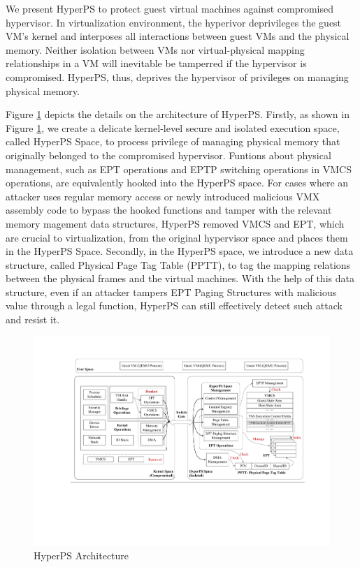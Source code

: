 We present HyperPS to protect guest virtual machines against compromised hypervisor. In virtualization environment, the hyperivor deprivileges the guest VM’s kernel and interposes all interactions between guest VMs and the physical memory. Neither isolation between VMs nor virtual-physical mapping relationships in a VM will inevitable be tamperred if the hypervisor is compromised. HyperPS, thus, deprives the hypervisor of privileges on managing physical memory.


Figure \ref{fig:design} depicts the details on the architecture of HyperPS. 
Firstly, as shown in Figure \ref{fig:design}, we create a delicate kernel-level secure and isolated execution space, called HyperPS Space, to process privilege of managing physical memory that originally belonged to the compromised hypervisor. 
Funtions about physical management, such as EPT operations and EPTP switching operations in VMCS operations, are equivalently hooked into the HyperPS space. 
For cases where an attacker uses regular memory access or newly introduced malicious VMX assembly code to bypass the hooked functions and tamper with the relevant memory magement data structures, HyperPS removed VMCS and EPT, which are crucial to virtualization, from the original hypervisor space and places them in the HyperPS Space.
Secondly, in the HyperPS space, we introduce a new data structure, called Physical Page Tag Table (PPTT), to tag the mapping relations between the physical frames and the virtual machines. With the help of this data structure, even if an attacker tampers EPT Paging Structures with malicious value through a legal function, HyperPS can still effectively detect such attack and resist it.


\begin{figure}[htpb]
    \centering
    \includegraphics[width=0.9\linewidth]{IMG/design.pdf}
    \caption{HyperPS Architecture}%
    \label{fig:design}
\end{figure}


















